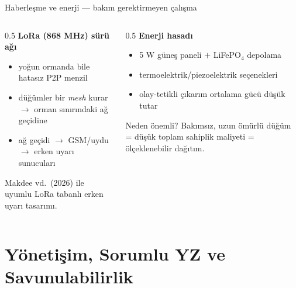 \documentclass[aspectratio=169,11pt]{beamer}
\newcommand{\src}[1]{{\scriptsize\color{aegisLeaf}#1}}
\begin{document}
\begin{frame}{Haberleşme ve enerji — bakım gerektirmeyen çalışma}
  \begin{columns}[T]
    \begin{column}{0.5\textwidth}
      \textbf{LoRa (868 MHz) sürü ağı}
      \begin{itemize}\small
        \item yoğun ormanda bile  hatasız P2P menzil
        \item düğümler bir \emph{mesh} kurar $\to$ orman sınırındaki ağ geçidine
        \item ağ geçidi $\to$ GSM/uydu $\to$ erken uyarı sunucuları
      \end{itemize}
      \src{Makdee vd.\ (2026) ile uyumlu LoRa tabanlı erken uyarı tasarımı.}
    \end{column}
    \begin{column}{0.5\textwidth}
      \textbf{Enerji hasadı}
      \begin{itemize}\small
        \item 5 W güneş paneli $+$ LiFePO$_4$ depolama
        \item termoelektrik/piezoelektrik seçenekleri
        \item olay-tetikli çıkarım ortalama gücü düşük tutar
      \end{itemize}
      \begin{block}{Neden önemli?}
        \small Bakımsız, uzun ömürlü düğüm = düşük toplam sahiplik maliyeti = ölçeklenebilir dağıtım.
      \end{block}
    \end{column}
  \end{columns}
\end{frame}

\section{Yönetişim, Sorumlu YZ ve Savunulabilirlik}
\end{document}
